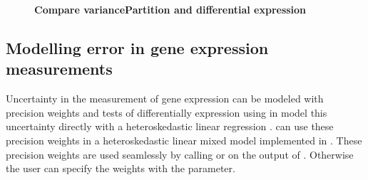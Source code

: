 \documentclass[12pt]{article}\usepackage[]{graphicx}\usepackage[]{xcolor}
\begin{document}
\begin{figure}[h]
\centering
\caption{
  \textbf{Compare variancePartition and differential expression}}
\label{fig:DEVP}
\end{figure}


\subsection{Modelling error in gene expression measurements}
Uncertainty in the measurement of gene expression can be modeled with precision weights and tests of differentially expression using  in  model this uncertainty directly with a heteroskedastic linear regression \cite{Law2014}.   can use these precision weights in a heteroskedastic linear mixed model implemented in  \cite{Bates2015}.  These precision weights are used seamlessly by calling  or  on the output of .  Otherwise the user can specify the weights with the  parameter.


\pagebreak
\end{document}
